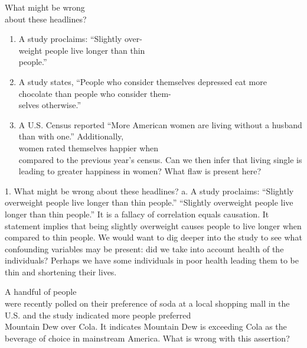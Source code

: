 \documentclass[11pt]{book}\usepackage[]{graphicx}\usepackage[]{color}
\begin{document}
\begin{exercises}
  \begin{exercise}  %

  What might be wrong \\ about these headlines?

  \begin{enumerate}
  \item A study proclaims: ``Slightly over- \\ weight people live longer than thin \\ people.''
  \item A study states, ``People who consider themselves depressed eat more chocolate  than people who consider them- \\ selves  otherwise.''
  \item A U.S. Census reported ``More American women are living without a husband than with one.''  Additionally, \\ women rated  themselves happier when \\ compared to the previous year's census.  Can we then infer that living single is leading to greater happiness in women?  What flaw is present here?
  \end{enumerate}

  \end{exercise}
  \begin{solution}  %

1.  What might be wrong about these headlines?
  a.	A study proclaims: ``Slightly overweight people live longer than thin people.'' ``Slightly overweight people live longer than thin people.''  It is a fallacy of correlation equals causation.  It statement implies that being slightly overweight causes people to live longer when compared to thin people.  We would want to dig deeper into the study to see what confounding variables may be present: did we take into account health of the individuals?  Perhaps we have some individuals in poor health leading them to be thin and shortening their lives.

  \end{solution}

   \begin{exercise}  %

A handful of people \\ were recently polled on their preference of soda at a local shopping mall in the U.S. and the study indicated more people preferred \\ Mountain Dew over Cola.  It indicates  Mountain Dew is exceeding Cola as the beverage of choice in mainstream America.  What is wrong with this assertion?


\end{exercise}
\end{exercises}
\end{document}

